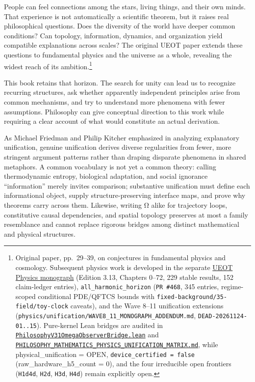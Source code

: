 \documentclass[
  english,
  11pt,
  oneside]{book}
\begin{document}
People can feel connections among the stars, living things, and their own minds. That experience is not automatically a scientific theorem, but it raises real philosophical questions. Does the diversity of the world have deeper common conditions? Can topology, information, dynamics, and organization yield compatible explanations across scales? The original UEOT paper extends these questions to fundamental physics and the universe as a whole, revealing the widest reach of its ambition.\footnote{\hypertarget{ph-note-65}{}Original paper, pp.~29--39, on conjectures in fundamental physics and cosmology. Subsequent physics work is developed in the separate \href{https://github.com/MurphyHoops/UEOT/blob/3d443ec29eb17af1fc00699a74e2d42d73516d81/physics/qm/book/UEOT_PHYSICS.en.md}{UEOT Physics monograph} (Edition 3.13, Chapters 0--72, 229 stable results, 152 claim-ledger entries), \texttt{all\_harmonic\_horizon} (\texttt{PR\ \#468}, 345 entries, regime-scoped conditional PDE/QFTCS bounds with \nolinkurl{fixed-background/35-field/toy-clock} caveats), and the Wave 8--11 unification extensions (\nolinkurl{physics/unification/WAVE8_11_MONOGRAPH_ADDENDUM.md}, \texttt{DEAD-20261124-01..15}). Pure-kernel Lean bridges are audited in \href{https://github.com/MurphyHoops/UEOT/blob/3d443ec29eb17af1fc00699a74e2d42d73516d81/formalization/ueot-physics-unification/UEOTPhysicsUnification/PhilosophyV31OmegaObserverBridge.lean}{\nolinkurl{PhilosophyV31OmegaObserverBridge.lean}} and \href{https://github.com/MurphyHoops/UEOT/blob/3d443ec29eb17af1fc00699a74e2d42d73516d81/physics/interfaces/PHILOSOPHY_MATHEMATICS_PHYSICS_UNIFICATION_MATRIX.md}{\nolinkurl{PHILOSOPHY_MATHEMATICS_PHYSICS_UNIFICATION_MATRIX.md}}, while physical\_unification = OPEN, \texttt{device\_certified\ =\ false} (raw\_hardware\_h5\_count = 0), and the four irreducible open frontiers (\texttt{H1d4d}, \texttt{H2d}, \texttt{H3d}, \texttt{H4d}) remain explicitly open.}

This book retains that horizon. The search for unity can lead us to recognize recurring structures, ask whether apparently independent principles arise from common mechanisms, and try to understand more phenomena with fewer assumptions. Philosophy can give conceptual direction to this work while requiring a clear account of what would constitute an actual derivation.

As Michael Friedman and Philip Kitcher emphasized in analyzing explanatory unification, genuine unification derives diverse regularities from fewer, more stringent argument patterns rather than draping disparate phenomena in shared metaphors. A common vocabulary is not yet a common theory: calling thermodynamic entropy, biological adaptation, and social ignorance ``information'' merely invites comparison; substantive unification must define each informational object, supply structure-preserving interface maps, and prove why theorems carry across them. Likewise, writing Ω alike for trajectory loops, constitutive causal dependencies, and spatial topology preserves at most a family resemblance and cannot replace rigorous bridges among distinct mathematical and physical structures.
\end{document}
